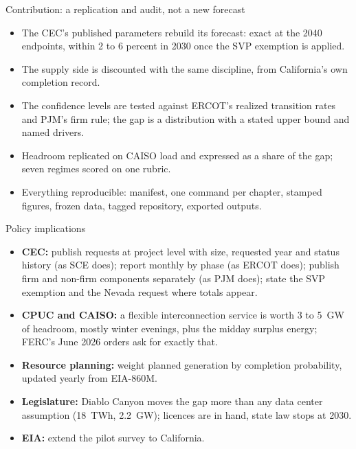 \documentclass[aspectratio=169,10pt]{beamer}
\begin{document}
\begin{frame}{Contribution: a replication and audit, not a new forecast}
\begin{itemize}
\item The CEC's published parameters rebuild its forecast: exact at the 2040 endpoints, within 2 to 6 percent in 2030 once the SVP exemption is applied.
\item The supply side is discounted with the same discipline, from California's own completion record.
\item The confidence levels are tested against ERCOT's realized transition rates and PJM's firm rule; the gap is a distribution with a stated upper bound and named drivers.
\item Headroom replicated on CAISO load and expressed as a share of the gap; seven regimes scored on one rubric.
\item Everything reproducible: manifest, one command per chapter, stamped figures, frozen data, tagged repository, exported outputs.
\end{itemize}
\end{frame}

\begin{frame}{Policy implications}
\begin{itemize}
\item \textbf{CEC:} publish requests at project level with size, requested year and status history (as SCE does); report monthly by phase (as ERCOT does); publish firm and non-firm components separately (as PJM does); state the SVP exemption and the Nevada request where totals appear.
\item \textbf{CPUC and CAISO:} a flexible interconnection service is worth 3 to 5~GW of headroom, mostly winter evenings, plus the midday surplus energy; FERC's June 2026 orders ask for exactly that.
\item \textbf{Resource planning:} weight planned generation by completion probability, updated yearly from EIA-860M.
\item \textbf{Legislature:} Diablo Canyon moves the gap more than any data center assumption (18~TWh, 2.2~GW); licences are in hand, state law stops at 2030.
\item \textbf{EIA:} extend the pilot survey to California.
\end{itemize}
\end{frame}
\end{document}
